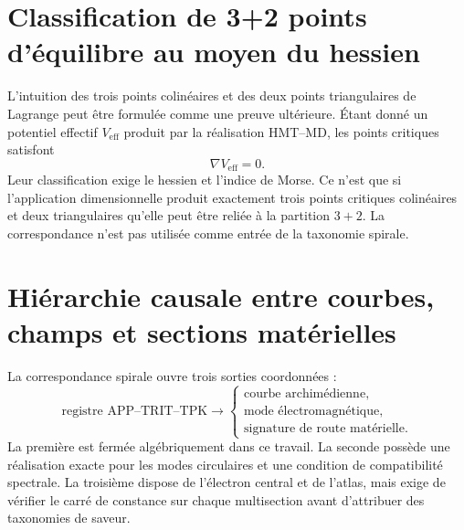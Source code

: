 \section{Classification de 3+2 points d'équilibre au moyen du hessien}

L'intuition des trois points colinéaires et des deux points triangulaires de Lagrange peut être formulée comme une preuve ultérieure. Étant donné un potentiel effectif \(V_{\mathrm{eff}}\) produit par la réalisation HMT--MD, les points critiques satisfont
\[
 \nabla V_{\mathrm{eff}}=0.
\]
Leur classification exige le hessien et l'indice de Morse. Ce n'est que si l'application dimensionnelle produit exactement trois points critiques colinéaires et deux triangulaires qu'elle peut être reliée à la partition \(3+2\). La correspondance n'est pas utilisée comme entrée de la taxonomie spirale.

\section{Hiérarchie causale entre courbes, champs et sections matérielles}

La correspondance spirale ouvre trois sorties coordonnées :
\[
 \text{registre APP--TRIT--TPK}
 \longrightarrow
 \begin{cases}
 \text{courbe archimédienne},\\
 \text{mode électromagnétique},\\
 \text{signature de route matérielle}.
 \end{cases}
\]
La première est fermée algébriquement dans ce travail. La seconde possède une réalisation exacte pour les modes circulaires et une condition de compatibilité spectrale. La troisième dispose de l'électron central et de l'atlas, mais exige de vérifier le carré de constance sur chaque multisection avant d'attribuer des taxonomies de saveur.

